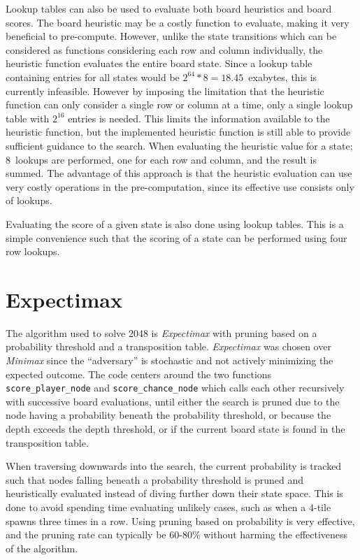Lookup tables can also be used to evaluate both board heuristics and board scores. The board heuristic may be a costly function to evaluate, making it very beneficial to pre-compute. However, unlike the state transitions which can be considered as functions considering each row and column individually, the heuristic function evaluates the entire board state. Since a lookup table containing entries for all states would be $2^{64}*8=18.45$~exabytes, this is currently infeasible. However by imposing the limitation that the heuristic function can only consider a single row or column at a time, only a single lookup table with $2^{16}$ entries is needed. This limits the information available to the heuristic function, but the implemented heuristic function is still able to provide sufficient guidance to the search. When evaluating the heuristic value for a state; 8~lookups are performed, one for each row and column, and the result is summed. The advantage of this approach is that the heuristic evaluation can use very costly operations in the pre-computation, since its effective use consists only of lookups.

Evaluating the score of a given state is also done using lookup tables. This is a simple convenience such that the scoring of a state can be performed using four row lookups.

\section*{Expectimax}

The algorithm used to solve \textsc{2048} is \textit{Expectimax} with pruning based on a probability threshold and a transposition table. \textit{Expectimax} was chosen over \textit{Minimax} since the ``adversary'' is stochastic and not actively minimizing the expected outcome. The code centers around the two functions \texttt{score\_player\_node} and \texttt{score\_chance\_node} which calls each other recursively with successive board evaluations, until either the search is pruned due to the node having a probability beneath the probability threshold, or because the depth exceeds the depth threshold, or if the current board state is found in the transposition table.

When traversing downwards into the search, the current probability is tracked such that nodes falling beneath a probability threshold is pruned and heuristically evaluated instead of diving further down their state space. This is done to avoid spending time evaluating unlikely cases, such as when a $4$-tile spawns three times in a row. Using pruning based on probability is very effective, and the pruning rate can typically be 60-80\% without harming the effectiveness of the algorithm.

